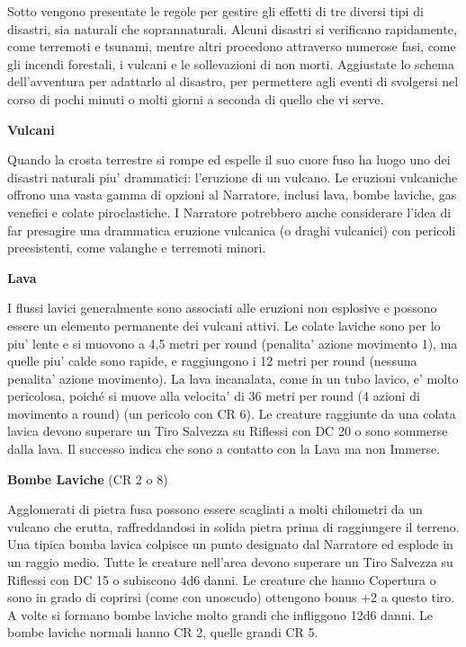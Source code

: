 \documentclass[a4paper,11pt,twoside,openany]{book}
\begin{document}
{		Sotto vengono presentate le regole per gestire gli effetti di tre diversi tipi di disastri, sia naturali che soprannaturali. Alcuni disastri si verificano rapidamente, come terremoti e tsunami, mentre altri procedono attraverso numerose fasi, come gli incendi forestali, i vulcani e le sollevazioni di non morti. Aggiustate lo schema dell'avventura per adattarlo al disastro, per permettere agli eventi di svolgersi nel corso di pochi minuti o molti giorni a seconda di quello che vi serve.
		
		\textbf{Vulcani}
		
		Quando la crosta terrestre si rompe ed espelle il suo cuore fuso ha luogo uno dei disastri naturali piu' drammatici: l'eruzione di un vulcano. Le eruzioni vulcaniche offrono una vasta gamma di opzioni al Narratore, inclusi lava, bombe laviche, gas venefici e colate piroclastiche. I Narratore potrebbero anche considerare l'idea di far presagire una drammatica eruzione vulcanica (o draghi vulcanici) con pericoli preesistenti, come valanghe e terremoti minori.
		
		\textbf{Lava}
		
		I flussi lavici generalmente sono associati alle eruzioni non esplosive e possono essere un elemento permanente dei vulcani attivi. Le colate laviche sono per lo piu' lente e si muovono a 4,5 metri per round (penalita' azione movimento 1), ma quelle piu' calde sono rapide, e raggiungono i 12 metri per round (nessuna penalita' azione movimento). La lava incanalata, come in un tubo lavico, e' molto pericolosa, poiché si muove alla velocita' di 36 metri per round (4 azioni di movimento a round) (un pericolo con CR 6). Le creature raggiunte da una colata lavica devono superare un Tiro Salvezza su Riflessi con DC 20 o sono sommerse dalla lava. Il successo indica che sono a contatto con la Lava ma non Immerse.
		
		\textbf{Bombe Laviche} (CR 2 o 8)
		
		Agglomerati di pietra fusa possono essere scagliati a molti chilometri da un vulcano che erutta, raffreddandosi in solida pietra prima di raggiungere il terreno. Una tipica bomba lavica colpisce un punto designato dal Narratore ed esplode in un raggio medio. Tutte le creature nell'area devono superare un Tiro Salvezza su Riflessi con DC 15 o subiscono 4d6 danni. Le creature che hanno Copertura o sono in grado di coprirsi (come con uno­scudo) ottengono bonus +2 a questo tiro. A volte si formano bombe laviche molto grandi che infliggono 12d6 danni. Le bombe laviche normali hanno CR 2, quelle grandi CR 5.
		
}
\end{document}
